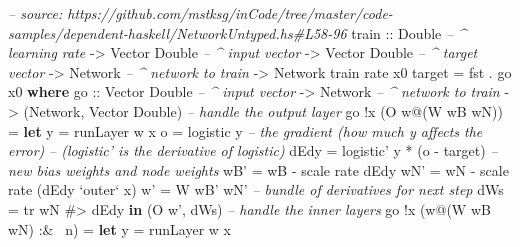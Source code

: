 \documentclass[]{article}
\newenvironment{Shaded}{}{}
\newcommand{\KeywordTok}[1]{\textcolor[rgb]{0.00,0.44,0.13}{\textbf{#1}}}
\newcommand{\DataTypeTok}[1]{\textcolor[rgb]{0.56,0.13,0.00}{#1}}
\newcommand{\CommentTok}[1]{\textcolor[rgb]{0.38,0.63,0.69}{\textit{#1}}}
\newcommand{\OtherTok}[1]{\textcolor[rgb]{0.00,0.44,0.13}{#1}}
\newcommand{\FunctionTok}[1]{\textcolor[rgb]{0.02,0.16,0.49}{#1}}
\newcommand{\NormalTok}[1]{#1}
\begin{document}
\begin{Shaded}
\begin{Highlighting}[]
\CommentTok{-- source: https://github.com/mstksg/inCode/tree/master/code-samples/dependent-haskell/NetworkUntyped.hs#L58-96}
\OtherTok{train ::} \DataTypeTok{Double}           \CommentTok{-- ^ learning rate}
      \OtherTok{->} \DataTypeTok{Vector} \DataTypeTok{Double}    \CommentTok{-- ^ input vector}
      \OtherTok{->} \DataTypeTok{Vector} \DataTypeTok{Double}    \CommentTok{-- ^ target vector}
      \OtherTok{->} \DataTypeTok{Network}          \CommentTok{-- ^ network to train}
      \OtherTok{->} \DataTypeTok{Network}
\NormalTok{train rate x0 target }\FunctionTok{=}\NormalTok{ fst }\FunctionTok{.}\NormalTok{ go x0}
  \KeywordTok{where}
\OtherTok{    go ::} \DataTypeTok{Vector} \DataTypeTok{Double}    \CommentTok{-- ^ input vector}
       \OtherTok{->} \DataTypeTok{Network}          \CommentTok{-- ^ network to train}
       \OtherTok{->}\NormalTok{ (}\DataTypeTok{Network}\NormalTok{, }\DataTypeTok{Vector} \DataTypeTok{Double}\NormalTok{)}
    \CommentTok{-- handle the output layer}
\NormalTok{    go }\FunctionTok{!}\NormalTok{x (}\DataTypeTok{O}\NormalTok{ w}\FunctionTok{@}\NormalTok{(}\DataTypeTok{W}\NormalTok{ wB wN))}
        \FunctionTok{=} \KeywordTok{let}\NormalTok{ y    }\FunctionTok{=}\NormalTok{ runLayer w x}
\NormalTok{              o    }\FunctionTok{=}\NormalTok{ logistic y}
              \CommentTok{-- the gradient (how much y affects the error)}
              \CommentTok{--   (logistic' is the derivative of logistic)}
\NormalTok{              dEdy }\FunctionTok{=}\NormalTok{ logistic' y }\FunctionTok{*}\NormalTok{ (o }\FunctionTok{-}\NormalTok{ target)}
              \CommentTok{-- new bias weights and node weights}
\NormalTok{              wB'  }\FunctionTok{=}\NormalTok{ wB }\FunctionTok{-}\NormalTok{ scale rate dEdy}
\NormalTok{              wN'  }\FunctionTok{=}\NormalTok{ wN }\FunctionTok{-}\NormalTok{ scale rate (dEdy }\OtherTok{`outer`}\NormalTok{ x)}
\NormalTok{              w'   }\FunctionTok{=} \DataTypeTok{W}\NormalTok{ wB' wN'}
              \CommentTok{-- bundle of derivatives for next step}
\NormalTok{              dWs  }\FunctionTok{=}\NormalTok{ tr wN }\FunctionTok{#>}\NormalTok{ dEdy}
          \KeywordTok{in}\NormalTok{  (}\DataTypeTok{O}\NormalTok{ w', dWs)}
    \CommentTok{-- handle the inner layers}
\NormalTok{    go }\FunctionTok{!}\NormalTok{x (w}\FunctionTok{@}\NormalTok{(}\DataTypeTok{W}\NormalTok{ wB wN) }\FunctionTok{:&~}\NormalTok{ n)}
        \FunctionTok{=} \KeywordTok{let}\NormalTok{ y          }\FunctionTok{=}\NormalTok{ runLayer w x}

\end{Highlighting}
\end{Shaded}
\end{document}
